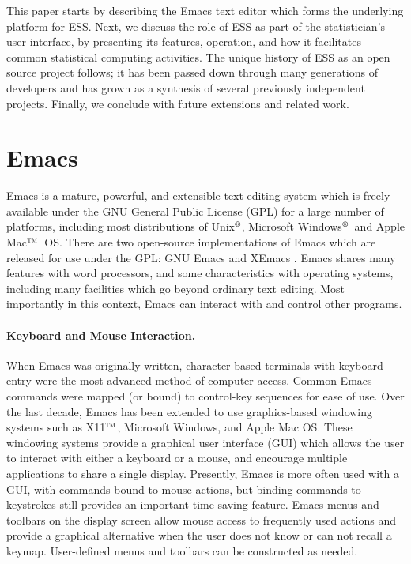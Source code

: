 \documentclass{article}
\newcommand*{\regstrd}{$^{\mbox{\scriptsize{\textregistered}}}$}
\newcommand*{\tm}{$^{\mbox{\scriptsize\sc tm}}$}
\begin{document}
This paper starts by describing the Emacs text editor which forms the
underlying platform for ESS.  Next, we discuss the role of ESS as part
of the statistician's user interface, by presenting its features,
operation, and how it facilitates common statistical computing
activities.  The unique history of ESS as an open source project
follows; it has been passed down through many generations of
developers and has grown as a synthesis of several previously
independent projects.  Finally, we conclude with future extensions and
related work.

\section{Emacs}
\label{sec:emacs}

Emacs is a mature, powerful, and extensible text editing system which
is freely available under the GNU General Public License (GPL) for a
large number of platforms, including most distributions of
Unix\regstrd, Microsoft Windows\regstrd\ and Apple Mac\tm\ OS.  There
are two open-source implementations of Emacs which are released for
use under the GPL: GNU Emacs \citep{GNU-Emacs} and XEmacs
\citep{XEmacs}.  Emacs shares many features with word processors, and
some characteristics with operating systems, including many facilities
which go beyond ordinary text editing.  Most importantly in this
context, Emacs can interact with and control other programs.

\paragraph{Keyboard and Mouse Interaction.}
When Emacs was originally written, character-based terminals with
keyboard entry were the most advanced method of computer access.
Common Emacs commands were mapped (or bound) to control-key sequences
for ease of use.  Over the last decade, Emacs has been extended to use
graphics-based windowing systems such as X11\tm, Microsoft Windows,
and Apple Mac OS.  These windowing systems provide a graphical user
interface (GUI) which allows the user to interact with either a
keyboard or a mouse, and encourage multiple applications to share a
single display.  Presently, Emacs is more often used with a GUI, with
commands bound to mouse actions, but binding commands to keystrokes
still provides an important time-saving feature.  Emacs menus and
toolbars on the display screen allow mouse access to frequently used
actions and provide a graphical alternative when the user does not
know or can not recall a keymap.  User-defined menus and toolbars can
be constructed as needed.
\end{document}
